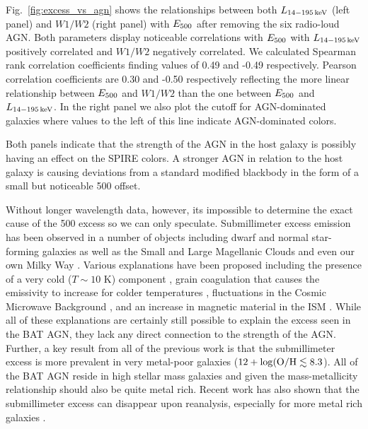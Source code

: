 Fig.~\ref{fig:excess_vs_agn} shows the relationships between both $L_{\rm 14-195\,keV}$ (left panel) and $W1/W2$ (right panel) with $E_{\rm 500}$ after removing the six radio-loud AGN. Both parameters display noticeable correlations with $E_{\rm 500}$ with $L_{\rm 14-195\,keV}$ positively correlated and $W1/W2$ negatively correlated. We calculated Spearman rank correlation coefficients finding values of 0.49 and -0.49 respectively. Pearson correlation coefficients are 0.30 and -0.50 respectively reflecting the more linear relationship between $E_{\rm 500}$ and $W1/W2$ than the one between $E_{\rm 500}$ and $L_{\rm 14-195\,keV}$. In the right panel we also plot the \citet{Stern:2012mz} cutoff for AGN-dominated galaxies where values to the left of this line indicate AGN-dominated colors. 

Both panels indicate that the strength of the AGN in the host galaxy is possibly having an effect on the SPIRE colors. A stronger AGN in relation to the host galaxy is causing deviations from a standard modified blackbody in the form of a small but noticeable 500 \um{} offset.

Without longer wavelength data, however, its impossible to determine the exact cause of the 500 \um{} excess so we can only speculate. Submillimeter excess emission has been observed in a number of objects including dwarf and normal star-forming galaxies \citep[e.g.][]{Galametz:2009cl, Galametz:2011ao, Dale:2012dq, Remy-Ruyer:2013kx} as well as the Small and Large Magellanic Clouds \citep{Bot:2010zm, Gordon:2010ix} and even our own Milky Way \citep{Paradis:2012oj}. Various explanations have been proposed including the presence of a very cold ($T \sim 10$ K) component \citep{Galametz:2009cl, Galametz:2011ao, OHalloran:2010wt}, grain coagulation that causes the emissivity to increase for colder temperatures \citep{Paradis:2009hb}, fluctuations in the Cosmic Microwave Background \citep{Planck-Collaboration:2011uk}, and an increase in magnetic material in the ISM \citep{Draine:2012vf}. While all of these explanations are certainly still possible to explain the excess seen in the BAT AGN, they lack any direct connection to the strength of the AGN. Further, a key result from all of the previous work is that the submillimeter excess is more prevalent in very metal-poor galaxies ($12 + \log(\rm{O/H} \lesssim 8.3$). All of the BAT AGN reside in high stellar mass galaxies \citep{Koss:2011vn} and given the mass-metallicity relationship \cite{Tremonti:2004fq} should also be quite metal rich. Recent work has also shown that the submillimeter excess can disappear upon reanalysis, especially for more metal rich galaxies \citep{Kirkpatrick:2013wq}.

